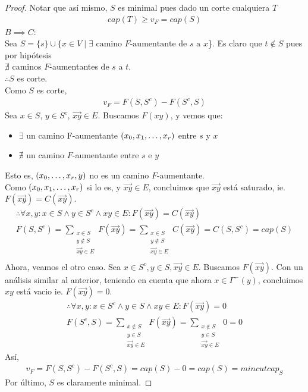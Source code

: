 \begin{proof}
Notar que así mismo, $S$ es minimal pues dado un corte cualquiera $T$\begin{align}
    cap(T) \ge v_F = cap(S)
\end{align}
$B \implies C:$\\
Sea $S = \{s\} \cup \{x \in V \mid \exists \text{ camino $F$-aumentante de $s$ a $x$}$\}.
Es claro que $t \notin S$ pues por hipótesis \\$\nexists$ caminos $F$-aumentantes de $s$ a $t$.\\
$\therefore S$ es corte.\\
Como $S$ es corte,
\begin{align}
    v_F = F(S, S^c) - F(S^c, S)
\end{align}
Sea $x \in S$, $y \in S^c$, $\overrightarrow{xy} \in E$. Buscamos $F(xy)$, y vemos que:
\begin{itemize}
    \item $\exists$ un camino F-aumentante $(x_0, x_1,\mathellipsis, x_r)$ entre $s$ y $x$
    \item $\nexists$ un camino $F$-aumentante entre $s$ e $y$
\end{itemize}
Esto es, $(x_0, \mathellipsis, x_r, y)$ no es un camino $F$-aumentante.\\
Como $(x_0, x_1, \mathellipsis, x_r)$ si lo es, y $\overrightarrow{xy} \in E$, concluimos que $\overrightarrow{xy}$ está saturado, ie. \\$F(\overrightarrow{xy}) = C(\overrightarrow{xy})$.
\begin{align}
    \therefore \forall x,y: x \in S \wedge y \in S^c \wedge xy \in E : F(\overrightarrow{xy}) = C(\overrightarrow{xy})\\
    F(S, S^c) = \sum_{\substack{x\in S\\ y \notin S \\\overrightarrow{xy} \in E}} F(\overrightarrow{xy}) = \sum_{\substack{x\in S\\ y \notin S\\ \overrightarrow{xy} \in E}} C(\overrightarrow{xy}) = C(S, S^c) = cap(S)\\
\end{align}
Ahora, veamos el otro caso. Sea $x \in S^c, y \in S, \overrightarrow{xy} \in E$. Buscamos $F(\overrightarrow{xy})$. Con un análisis similar al anterior, teniendo en cuenta que ahora $x\in \Gamma^-(y)$, concluimos $xy$ está vacio ie. $F(\overrightarrow{xy}) = 0$.
\begin{align}
    \therefore \forall x, y : x \in S^c \wedge y \in S \wedge xy \in E : F(\overrightarrow{xy}) = 0\\
    F(S^c, S) = \sum_{\substack{x\not\in S\\ y \in S\\ \overrightarrow{xy} \in E}} F(\overrightarrow{xy}) = \sum_{\substack{x\not\in S\\ y \in S\\ \overrightarrow{xy} \in E}} 0 = 0
\end{align}
Así,
\begin{align}
v_F = F(S, S^c) - F(S^c, S) = cap(S) - 0 = cap(S) = mincutcap_S
\end{align}
Por último, $S$ es claramente minimal.


\end{proof}

